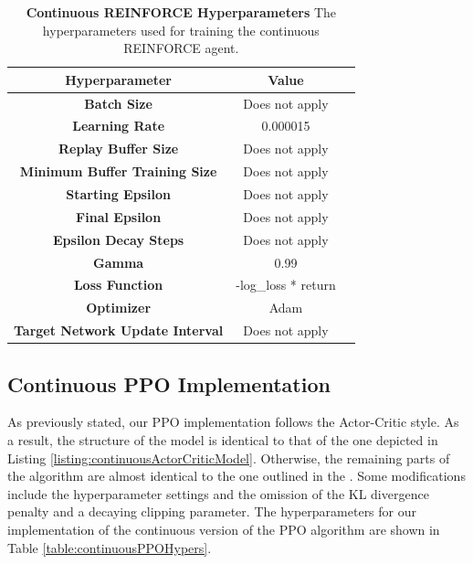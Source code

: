 \documentclass[conference]{IEEEtran}
\begin{document}
\begin{table}[htbp]
    \caption{\textbf{Continuous REINFORCE Hyperparameters}  The hyperparameters used for training the continuous REINFORCE agent.}
\begin{center}
\begin{tabular}{|c|c|c|}
\hline
\textbf{Hyperparameter} & \textbf{Value} \\
\hline
\textbf{Batch Size} & Does not apply \\
\hline
\textbf{Learning Rate} & 0.000015\\
\hline
\textbf{Replay Buffer Size} & Does not apply \\
\hline
\textbf{Minimum Buffer Training Size} & Does not apply \\
\hline
\textbf{Starting Epsilon} & Does not apply \\
\hline
\textbf{Final Epsilon} & Does not apply \\
\hline
\textbf{Epsilon Decay Steps} & Does not apply \\
\hline
\textbf{Gamma} & 0.99\\
\hline
\textbf{Loss Function} &  -log\_loss * return \\
\hline
\textbf{Optimizer} & Adam \\
\hline
\textbf{Target Network Update Interval} & Does not apply \\
\hline
\end{tabular}
\label{table:countinuousREINFORCEHypers}
\end{center}
\end{table}

\subsection{Continuous PPO Implementation}
As previously stated, our PPO implementation follows the Actor-Critic style. As a result, the structure of the model is identical to that of the one depicted in Listing \ref{listing:continuousActorCriticModel}. Otherwise, the remaining parts of the algorithm are almost identical to the one outlined in the \cite{schulman2017proximal}. Some modifications include the hyperparameter settings and the omission of the KL divergence penalty and a decaying clipping parameter. The hyperparameters for our implementation of the continuous version of the PPO algorithm are shown in Table \ref{table:continuousPPOHypers}.
\end{document}

